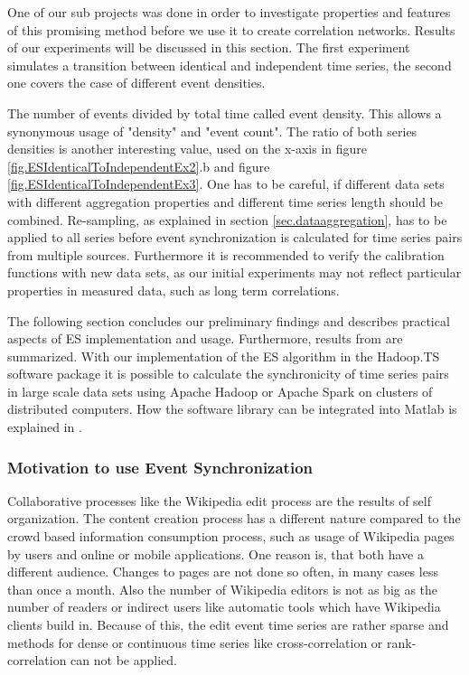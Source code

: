 \documentclass[a4paper,10pt]{scrbook}
\begin{document}
One of our sub projects was done in order to investigate properties and features of this promising method before we use it to create correlation networks. Results of our experiments will be discussed in this section. The first experiment simulates a transition between identical and independent time series, the second one covers the case of different event densities. 

The number of events divided by total time called event density. This allows a synonymous usage of "density" and "event count". The ratio of both series densities is another interesting value, used on the x-axis in figure \ref{fig.ESIdenticalToIndependentEx2}.b and figure \ref{fig.ESIdenticalToIndependentEx3}. One has to be careful, if different data sets with different aggregation properties and different time series length should be combined. Re-sampling, as explained in section \ref{sec.dataaggregation}, 
has to be applied to all series before event synchronization is calculated for time series pairs from multiple sources. Furthermore it is recommended to verify the calibration functions with new data sets, as our initial experiments may not 
reflect particular properties in measured data, such as long term correlations.
 
The following section concludes our preliminary findings and describes practical aspects of ES implementation and usage. Furthermore, results from \cite{Boeker2012} are summarized. 
With our implementation of the ES algorithm in the Hadoop.TS software package \cite{Hadoop.TS} it is possible to calculate the synchronicity of time series pairs in large scale data sets using Apache Hadoop or Apache Spark on clusters of distributed computers. How the software library can be integrated into Matlab is explained in \cite{Hadoop.TS.Matlab.Integration}.

\subsubsection*{Motivation to use Event Synchronization}
Collaborative processes like the Wikipedia edit process are the results of self organization. The content creation process has a different nature compared to the crowd based information consumption process, such as usage of Wikipedia pages by users and online or mobile applications. One reason is, that both have a different audience. Changes to pages are not done so often, in many cases less than once a month. Also the number of Wikipedia editors is not as big as the number of readers or indirect users like automatic tools which have Wikipedia clients build in. Because of this, the edit event time series are rather sparse and methods for dense or continuous time series like cross-correlation or rank-correlation can not be applied. 
\end{document}
